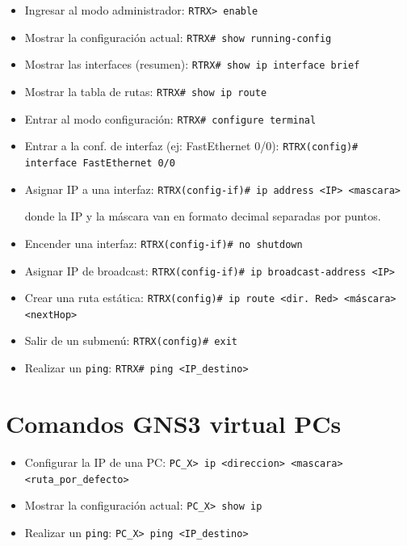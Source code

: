 \documentclass[a4paper,10pt]{article}
\begin{document}
\begin{itemize}
    \item Ingresar al modo administrador:
\texttt{RTRX> enable}
    \item Mostrar la configuración actual:
    \texttt{RTRX# show running-config}
    \item Mostrar las interfaces (resumen): \texttt{RTRX# show ip interface brief}
    \item Mostrar la tabla de rutas:
    \texttt{RTRX# show ip route}
    \item Entrar al modo configuración: \texttt{RTRX# configure terminal}
    \item Entrar a la conf. de interfaz (ej: FastEthernet 0/0): \texttt{RTRX(config)# interface FastEthernet 0/0}
    \item Asignar IP a una interfaz: \texttt{RTRX(config-if)# ip address <IP> <mascara>}
    
    donde la IP y la máscara van en formato decimal separadas por puntos.
    \item Encender una interfaz: \texttt{RTRX(config-if)# no shutdown}
    \item Asignar IP de broadcast: \texttt{RTRX(config-if)# ip broadcast-address <IP>}
    \item Crear una ruta estática: \texttt{RTRX(config)# ip route <dir. Red> <máscara> <nextHop>}
    \item Salir de un submenú: \texttt{RTRX(config)# exit}
    \item Realizar un \texttt{ping}: \texttt{RTRX# ping <IP_destino>}
\end{itemize}

\section{Comandos GNS3 virtual PCs}

\begin{itemize}
    \item Configurar la IP de una PC:
\texttt{PC_X> ip <direccion> <mascara> <ruta_por_defecto>}
    \item Mostrar la configuración actual:
    \texttt{PC_X> show ip}
    \item Realizar un \texttt{ping}: \texttt{PC_X> ping <IP_destino>}
\end{itemize}
\end{document}
